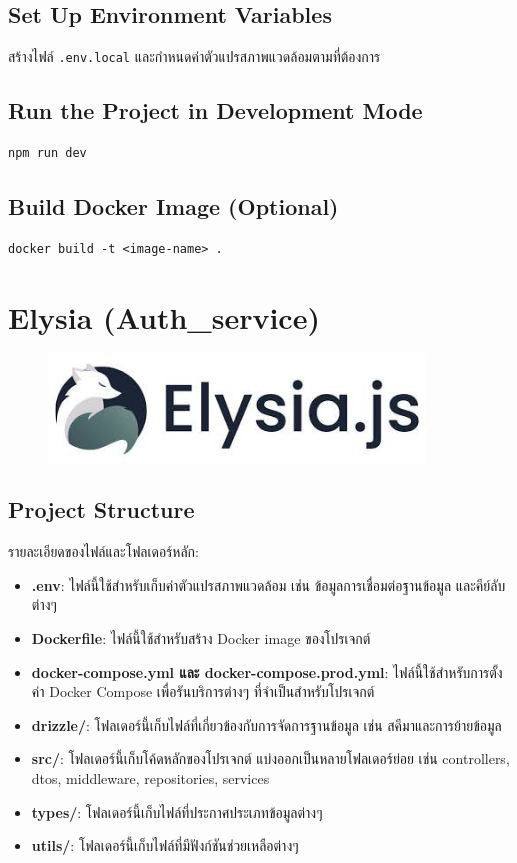 \subsection{Set Up Environment Variables}
สร้างไฟล์ \texttt{.env.local} และกำหนดค่าตัวแปรสภาพแวดล้อมตามที่ต้องการ

\subsection{Run the Project in Development Mode}
\begin{verbatim}
npm run dev
\end{verbatim}

\subsection{Build Docker Image (Optional)}
\begin{verbatim}
docker build -t <image-name> .
\end{verbatim}

\section{Elysia (Auth\_service)}
\begin{figure}[H]
    \centering
    \includegraphics[width=100mm, keepaspectratio ]{pictures/elysia.jpg}
    
\end{figure}
\subsection{Project Structure}
รายละเอียดของไฟล์และโฟลเดอร์หลัก:
\begin{itemize}
    \item \textbf{.env}: ไฟล์นี้ใช้สำหรับเก็บค่าตัวแปรสภาพแวดล้อม เช่น ข้อมูลการเชื่อมต่อฐานข้อมูล และคีย์ลับต่างๆ
    \item \textbf{Dockerfile}: ไฟล์นี้ใช้สำหรับสร้าง Docker image ของโปรเจกต์
    \item \textbf{docker-compose.yml และ docker-compose.prod.yml}: ไฟล์นี้ใช้สำหรับการตั้งค่า Docker Compose เพื่อรันบริการต่างๆ ที่จำเป็นสำหรับโปรเจกต์
    \item \textbf{drizzle/}: โฟลเดอร์นี้เก็บไฟล์ที่เกี่ยวข้องกับการจัดการฐานข้อมูล เช่น สคีมาและการย้ายข้อมูล
    \item \textbf{src/}: โฟลเดอร์นี้เก็บโค้ดหลักของโปรเจกต์ แบ่งออกเป็นหลายโฟลเดอร์ย่อย เช่น controllers, dtos, middleware, repositories, services
    \item \textbf{types/}: โฟลเดอร์นี้เก็บไฟล์ที่ประกาศประเภทข้อมูลต่างๆ
    \item \textbf{utils/}: โฟลเดอร์นี้เก็บไฟล์ที่มีฟังก์ชันช่วยเหลือต่างๆ
\end{itemize}

